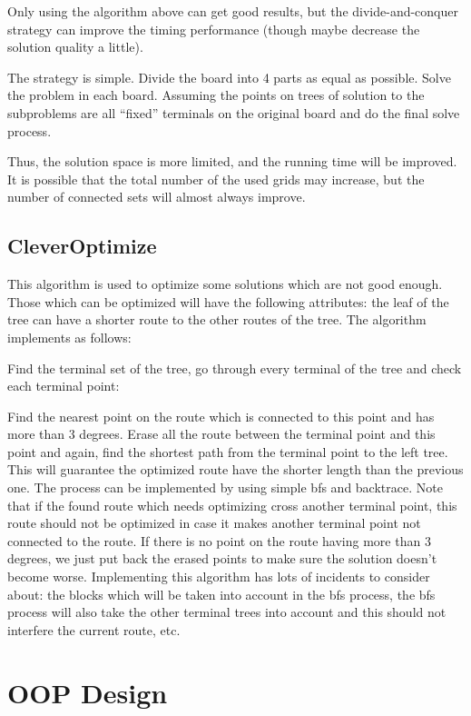 \documentclass[12pt, a4paper]{article}
\begin{document}
	Only using the algorithm above can get good results, but the divide-and-conquer strategy can improve the timing performance (though maybe decrease the solution quality a little).
	
	The strategy is simple. Divide the board into 4 parts as equal as possible. Solve the problem in each board. Assuming the points on trees of solution to the subproblems are all ``fixed'' terminals on the original board and do the final solve process.
	
	Thus, the solution space is more limited, and the running time will be improved. It is possible that the total number of the used grids may increase, but the number of connected sets will almost always improve.
	
	\subsection{CleverOptimize}
		
		This algorithm is used to optimize some solutions which are not good enough. Those which can be optimized will have the following attributes: the leaf of the tree can have a shorter route to the other routes of the tree. The algorithm implements as follows:
		
		Find the terminal set of the tree, go through every terminal of the tree and check each terminal point:
			
			Find the nearest point on the route which is connected to this point and has more than 3 degrees. Erase all the route between the terminal point and this point and again, find the shortest path from the terminal point to the left tree. This will guarantee the optimized route have the shorter length than the previous one. The process can be implemented by using simple bfs and backtrace. Note that if the found route which needs optimizing cross another terminal point, this route should not be optimized in case it makes another terminal point not connected to the route. If there is no point on the route having more than 3 degrees, we just put back the erased points to make sure the solution doesn't become worse. Implementing this algorithm has lots of incidents to consider about: the blocks which will be taken into account in the bfs process, the bfs process will also take the other terminal trees into account and this should not interfere the current route, etc.
	
	\section{OOP Design}
	
\end{document}
